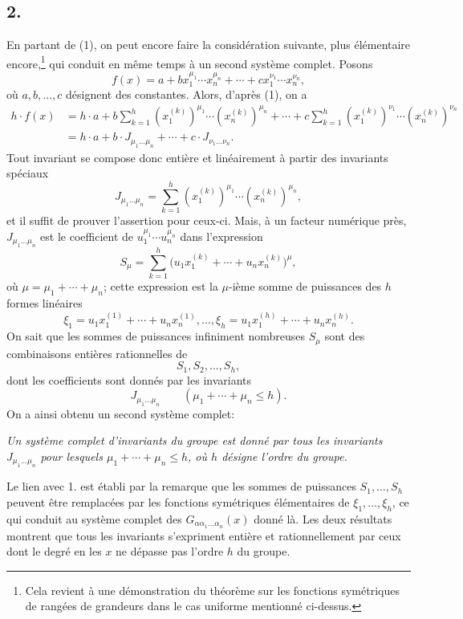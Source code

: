 \subsection*{2.}
En partant de (1), on peut encore faire la considération suivante, plus élémentaire encore,\footnote{Cela revient à une démonstration du théorème sur les fonctions symétriques de rangées de grandeurs dans le cas uniforme mentionné ci-dessus.} qui conduit en même temps à un second système complet. Posons
\[
  f(x)=a+b x_1^{\mu_1}\cdots x_n^{\mu_n}
       +\cdots+c x_1^{\nu_1}\cdots x_n^{\nu_n},
\]
où $a,b,\ldots,c$ désignent des constantes. Alors, d'après (1), on a
\[
\begin{aligned}
 h\cdot f(x)
 &=h\cdot a+b\sum_{k=1}^{h}(x_1^{(k)})^{\mu_1}\cdots(x_n^{(k)})^{\mu_n}
     +\cdots
     +c\sum_{k=1}^{h}(x_1^{(k)})^{\nu_1}\cdots(x_n^{(k)})^{\nu_n} \\
 &=h\cdot a+b\cdot J_{\mu_1\ldots\mu_n}+\cdots+c\cdot J_{\nu_1\ldots\nu_n}.
\end{aligned}
\]
Tout invariant se compose donc entière et linéairement à partir des invariants spéciaux
\[
  J_{\mu_1\ldots\mu_n}
  =\sum_{k=1}^{h}(x_1^{(k)})^{\mu_1}\cdots(x_n^{(k)})^{\mu_n},
\]
et il suffit de prouver l'assertion pour ceux-ci. Mais, à un facteur numérique près, $J_{\mu_1\ldots\mu_n}$ est le coefficient de $u_1^{\mu_1}\cdots u_n^{\mu_n}$ dans l'expression
\[
  S_\mu=\sum_{k=1}^{h}
  \bigl(u_1x_1^{(k)}+\cdots+u_nx_n^{(k)}\bigr)^{\mu},
\]
où $\mu=\mu_1+\cdots+\mu_n$; cette expression est la $\mu$-ième somme de puissances des $h$ formes linéaires
\[
  \xi_1=u_1x_1^{(1)}+\cdots+u_nx_n^{(1)},\ldots,
  \xi_h=u_1x_1^{(h)}+\cdots+u_nx_n^{(h)}.
\]
On sait que les sommes de puissances infiniment nombreuses $S_\mu$ sont des combinaisons entières rationnelles de
\[
  S_1,S_2,\ldots,S_h,
\]
dont les coefficients sont donnés par les invariants
\[
  J_{\mu_1\ldots\mu_n}\qquad(\mu_1+\cdots+\mu_n\le h).
\]
On a ainsi obtenu un second système complet:

\emph{Un système complet d'invariants du groupe est donné par tous les invariants $J_{\mu_1\ldots\mu_n}$ pour lesquels $\mu_1+\cdots+\mu_n\le h$, où $h$ désigne l'ordre du groupe.}

Le lien avec 1. est établi par la remarque que les sommes de puissances $S_1,\ldots,S_h$ peuvent être remplacées par les fonctions symétriques élémentaires de $\xi_1,\ldots,\xi_h$, ce qui conduit au système complet des $G_{\alpha\alpha_1\ldots\alpha_n}(x)$ donné là. Les deux résultats montrent que tous les invariants s'expriment entière et rationnellement par ceux dont le degré en les $x$ ne dépasse pas l'ordre $h$ du groupe.

